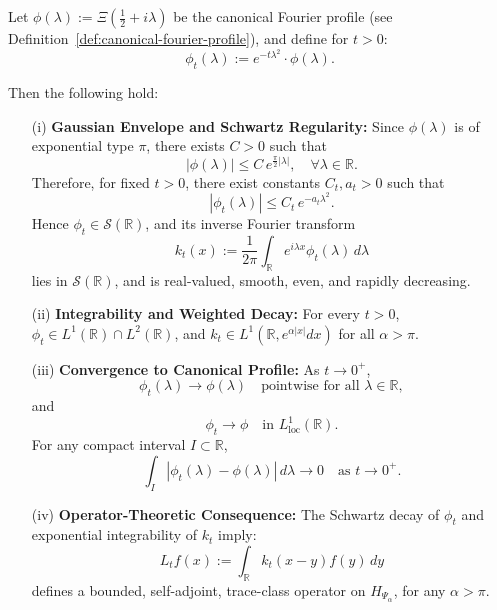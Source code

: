 \begin{lemma}
\label{lem:mollified-profile-decay}
Let \( \phi(\lambda) := \Xi\left( \tfrac{1}{2} + i\lambda \right) \) be the canonical Fourier profile (see Definition~\ref{def:canonical-fourier-profile}), and define for \( t > 0 \):
\[
\phi_t(\lambda) := e^{-t\lambda^2} \cdot \phi(\lambda).
\]

Then the following hold:

\begin{enumerate}
    \item[\textnormal{(i)}] \textbf{Gaussian Envelope and Schwartz Regularity:} Since \( \phi(\lambda) \) is of exponential type \( \pi \), there exists \( C > 0 \) such that
    \[
    |\phi(\lambda)| \le C\, e^{\frac{\pi}{2}|\lambda|}, \quad \forall \lambda \in \mathbb{R}.
    \]
    Therefore, for fixed \( t > 0 \), there exist constants \( C_t, a_t > 0 \) such that
    \[
    |\phi_t(\lambda)| \le C_t\, e^{-a_t \lambda^2}.
    \]
    Hence \( \phi_t \in \mathcal{S}(\mathbb{R}) \), and its inverse Fourier transform
    \[
    k_t(x) := \frac{1}{2\pi} \int_{\mathbb{R}} e^{i\lambda x} \phi_t(\lambda)\, d\lambda
    \]
    lies in \( \mathcal{S}(\mathbb{R}) \), and is real-valued, smooth, even, and rapidly decreasing.

    \item[\textnormal{(ii)}] \textbf{Integrability and Weighted Decay:} For every \( t > 0 \), \( \phi_t \in L^1(\mathbb{R}) \cap L^2(\mathbb{R}) \), and \( k_t \in L^1(\mathbb{R}, e^{\alpha |x|} dx) \) for all \( \alpha > \pi \).

    \item[\textnormal{(iii)}] \textbf{Convergence to Canonical Profile:} As \( t \to 0^+ \),
    \[
    \phi_t(\lambda) \to \phi(\lambda) \quad \text{pointwise for all } \lambda \in \mathbb{R},
    \]
    and
    \[
    \phi_t \to \phi \quad \text{in } L^1_{\mathrm{loc}}(\mathbb{R}).
    \]
    For any compact interval \( I \subset \mathbb{R} \),
    \[
    \int_I |\phi_t(\lambda) - \phi(\lambda)|\, d\lambda \to 0 \quad \text{as } t \to 0^+.
    \]

    \item[\textnormal{(iv)}] \textbf{Operator-Theoretic Consequence:} The Schwartz decay of \( \phi_t \) and exponential integrability of \( k_t \) imply:
    \[
    L_t f(x) := \int_{\mathbb{R}} k_t(x - y) f(y)\, dy
    \]
    defines a bounded, self-adjoint, trace-class operator on \( H_{\Psi_\alpha} \), for any \( \alpha > \pi \).
\end{enumerate}
\end{lemma}
% 